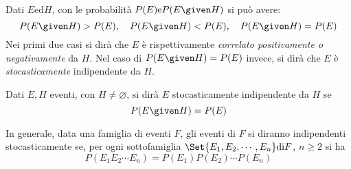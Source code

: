 \documentclass{subfiles}
\begin{document}
Dati \(E \text{ed} H\), con le probabilità \(P(E) \text{e} P(E \given H)\) si può avere:
\[
    P(E \given H) > P(E), \quad P(E \given H) < P(E), \quad P(E \given H) = P(E)
\]
Nei primi due casi si dirà che \(E\) è rispettivamente \emph{correlato positivamente o negativamente} da \(H\).
Nel caso di \(P(E \given H) = P(E)\) invece, si dirà che \(E\) è \emph{stocasticamente} indipendente da \(H\).

\begin{Definition*}
    Dati \(E, H\) eventi, con \(H \neq \varnothing\), si dirà \(E\) stocasticamente indipendente da \(H\) se
    \begin{equation}
        P(E \given H) = P(E)
    \end{equation}
\end{Definition*}
\noindent
In generale, data una famiglia di eventi \(F\), gli eventi di \(F\) si diranno indipendenti stocasticamente se,
per ogni sottofamiglia \(\Set{E_{1}, E_{2}, \cdots, E_{n}} \text{di} F\), \(n \ge 2\) si ha
\[
    P(E_{1}E_{2}\cdots E_{n}) = P(E_{1})P(E_{2})\cdots P(E_{n})
\]
\end{document}
